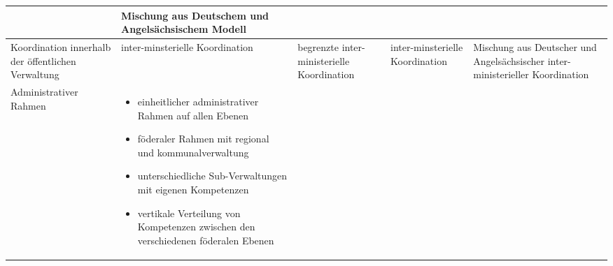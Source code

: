 \begin{landscape}
\begin{scriptsize}
\begin{longtable}[H]{|L{4cm}|L{5cm}|L{5cm}|L{5cm}|L{4cm}|}
\begin{itemize}
\end{itemize}
\vspace{-1mm}
&
Mischung aus Deutschem und Angelsächsischem Modell\\\hline
Koordination innerhalb der öffentlichen Verwaltung	&inter-minsterielle Koordination	&begrenzte inter-ministerielle Koordination&	inter-minsterielle Koordination&	Mischung aus Deutscher und Angelsächsischer inter-ministerieller Koordination\\\hline
Administrativer Rahmen	&
 \vspace{-2mm}
\begin{itemize}
\item einheitlicher administrativer Rahmen auf allen Ebenen
\item föderaler Rahmen mit regional und kommunalverwaltung
\item unterschiedliche Sub-Verwaltungen mit eigenen Kompetenzen
\item vertikale Verteilung von Kompetenzen zwischen den verschiedenen föderalen Ebenen
 \vspace{-2mm}\end{itemize}


\end{longtable}
\end{scriptsize}
\end{landscape}
